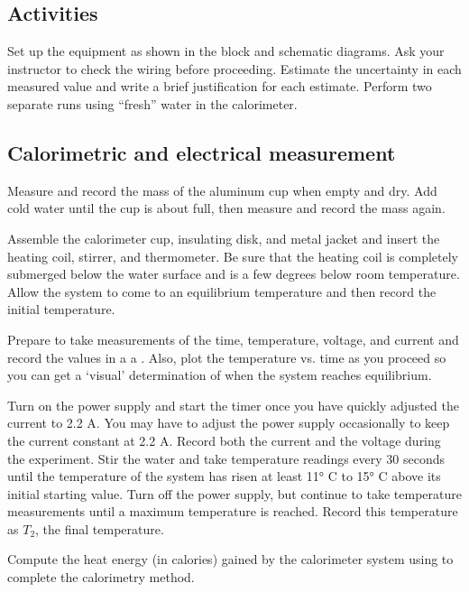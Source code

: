 \begin{multicols}{2}
\section{Activities}
Set up the equipment as shown in the block and schematic diagrams.  Ask your instructor to check the wiring before proceeding.  Estimate the uncertainty in each measured value and write a brief justification for each estimate. Perform two separate runs using ``fresh'' water in the calorimeter.

\subsection{Calorimetric and electrical measurement}

Measure and record the mass of the aluminum cup when empty and dry.
Add cold water until the cup is about  full, then measure and record the mass again.

Assemble the calorimeter cup, insulating disk, and metal jacket and insert the heating coil, stirrer, and thermometer.  Be sure that the heating coil is completely submerged below the water surface and is a few degrees below room temperature. Allow the system to come to an equilibrium temperature and then record the initial temperature.

Prepare to take measurements of the time, temperature, voltage, and current and record the values in a a 
. Also, plot the temperature vs. time as you proceed so you can get a `visual' determination of when the system reaches equilibrium.

Turn on the power supply and start the timer once you have quickly adjusted the current to 2.2 A.  You may have to adjust the power supply occasionally to keep the current constant at 2.2 A.  Record both the current and the voltage during the experiment.  Stir the water and take temperature readings every 30 seconds until the temperature of the system has risen at least \ang{11} C to \ang{15} C above its initial starting value.  Turn off the power supply, but continue to take temperature measurements %
until a maximum temperature is reached. Record this temperature as $T_2$, the final temperature.

Compute the heat energy (in calories) gained by the calorimeter system using  to complete the calorimetry method. %


\end{multicols}
